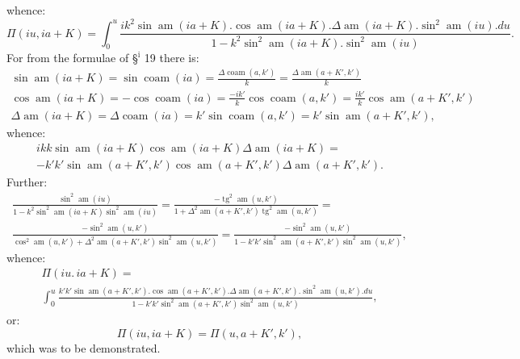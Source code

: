 \documentclass{article}
\begin{document}
whence:
\[
\Pi(iu,ia+K)=\int_{0}^{u}\frac{ik^{2}\sin\operatorname{am}(ia+K).\cos\operatorname{am}(ia+K).\Delta\operatorname{am}(ia+K).\sin^{2}\operatorname{am}(iu).du}{1-k^{2}\sin^{2}\operatorname{am}(ia+K).\sin^{2}\operatorname{am}(iu)}.
\]
For from the formulae of §$^{\mathrm{i}}$ 19 there is:
\[
\begin{gathered}
\sin\operatorname{am}(ia+K)=\sin\operatorname{coam}(ia)=\frac{\Delta\operatorname{coam}(a,k')}{k}=\frac{\Delta\operatorname{am}(a+K',k')}{k}\\[1.5ex]
\cos\operatorname{am}(ia+K)=-\cos\operatorname{coam}(ia)=\frac{-ik'}{k}\cos\operatorname{coam}(a,k')=\frac{ik'}{k}\cos\operatorname{am}(a+K',k')\\[1.5ex]
\Delta\operatorname{am}(ia+K)=\Delta\operatorname{coam}(ia)=k'\sin\operatorname{coam}(a,k')=k'\sin\operatorname{am}(a+K',k'),
\end{gathered}
\]
whence:
\[
\begin{gathered}
ikk\sin\operatorname{am}(ia+K)\cos\operatorname{am}(ia+K)\Delta\operatorname{am}(ia+K)=\\
-k'k'\sin\operatorname{am}(a+K',k')\cos\operatorname{am}(a+K',k')\Delta\operatorname{am}(a+K',k').
\end{gathered}
\]
Further:
\[
\begin{gathered}
\frac{\sin^{2}\operatorname{am}(iu)}{1-k^{2}\sin^{2}\operatorname{am}(ia+K)\sin^{2}\operatorname{am}(iu)}=\frac{-\operatorname{tg}^{2}\operatorname{am}(u,k')}{1+\Delta^{2}\operatorname{am}(a+K',k')\operatorname{tg}^{2}\operatorname{am}(u,k')}=\\[1.5ex]
\frac{-\sin^{2}\operatorname{am}(u,k')}{\cos^{2}\operatorname{am}(u,k')+\Delta^{2}\operatorname{am}(a+K',k')\sin^{2}\operatorname{am}(u,k')}=\frac{-\sin^{2}\operatorname{am}(u,k')}{1-k'k'\sin^{2}\operatorname{am}(a+K',k')\sin^{2}\operatorname{am}(u,k')},
\end{gathered}
\]
whence:
\[
\begin{gathered}
\Pi(iu.\,ia+K)=\\[1.5ex]
\int_{0}^{u}\frac{k'k'\sin\operatorname{am}(a+K',k').\cos\operatorname{am}(a+K',k').\Delta\operatorname{am}(a+K',k').\sin^{2}\operatorname{am}(u,k').du}{1-k'k'\sin^{2}\operatorname{am}(a+K',k')\sin^{2}\operatorname{am}(u,k')},
\end{gathered}
\]
or:
\[
\Pi(iu,ia+K)=\Pi(u,a+K',k'),
\]
which was to be demonstrated.
\end{document}
